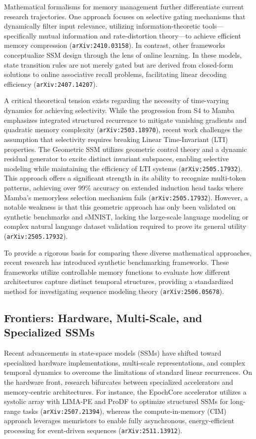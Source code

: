\documentclass[11pt]{article}
\begin{document}
Mathematical formalisms for memory management further differentiate current research trajectories. One approach focuses on selective gating mechanisms that dynamically filter input relevance, utilizing information-theoretic tools—specifically mutual information and rate-distortion theory—to achieve efficient memory compression (\texttt{arXiv:2410.03158}). In contrast, other frameworks conceptualize SSM design through the lens of online learning. In these models, state transition rules are not merely gated but are derived from closed-form solutions to online associative recall problems, facilitating linear decoding efficiency (\texttt{arXiv:2407.14207}).

A critical theoretical tension exists regarding the necessity of time-varying dynamics for achieving selectivity. While the progression from S4 to Mamba emphasizes integrated structured recurrence to mitigate vanishing gradients and quadratic memory complexity (\texttt{arXiv:2503.18970}), recent work challenges the assumption that selectivity requires breaking Linear Time-Invariant (LTI) properties. The Geometric SSM utilizes geometric control theory and a dynamic residual generator to excite distinct invariant subspaces, enabling selective modeling while maintaining the efficiency of LTI systems (\texttt{arXiv:2505.17932}). This approach offers a significant strength in its ability to recognize multi-token patterns, achieving over 99\% accuracy on extended induction head tasks where Mamba’s memoryless selection mechanism fails (\texttt{arXiv:2505.17932}). However, a notable weakness is that this geometric approach has only been validated on synthetic benchmarks and sMNIST, lacking the large-scale language modeling or complex natural language dataset validation required to prove its general utility (\texttt{arXiv:2505.17932}).

To provide a rigorous basis for comparing these diverse mathematical approaches, recent research has introduced synthetic benchmarking frameworks. These frameworks utilize controllable memory functions to evaluate how different architectures capture distinct temporal structures, providing a standardized method for investigating sequence modeling theory (\texttt{arXiv:2506.05678}).

\subsection{Frontiers: Hardware, Multi-Scale, and Specialized SSMs}

Recent advancements in state-space models (SSMs) have shifted toward specialized hardware implementations, multi-scale representations, and complex temporal dynamics to overcome the limitations of standard linear recurrences. On the hardware front, research bifurcates between specialized accelerators and memory-centric architectures. For instance, the EpochCore accelerator utilizes a systolic array with LIMA-PE and ProDF to optimize structured SSMs for long-range tasks (\texttt{arXiv:2507.21394}), whereas the compute-in-memory (CIM) approach leverages memristors to enable fully asynchronous, energy-efficient processing for event-driven sequences (\texttt{arXiv:2511.13912}).
\end{document}
